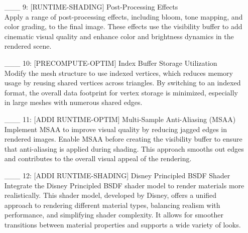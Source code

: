 \documentclass {article}
\begin{document}
\begin{enumerate}
     \item[\_\_\_ 9:]  [RUNTIME-SHADING] Post-Processing Effects
     \\ Apply a range of post-processing effects, including bloom, tone mapping, and color grading, to the final image. These 
     effects use the visibility buffer to add cinematic visual quality and enhance color and brightness dynamics in the rendered scene.
 
     \item[\_\_\_ 10:]  [PRECOMPUTE-OPTIM] Index Buffer Storage Utilization
     \\ Modify the mesh structure to use indexed vertices, which reduces memory usage by reusing shared vertices across triangles. 
     By switching to an indexed format, the overall data footprint for vertex storage is minimized, especially in large meshes with 
     numerous shared edges.
 
     \item[\_\_\_ 11:]  [ADDI RUNTIME-OPTIM] Multi-Sample Anti-Aliasing (MSAA)
     \\ Implement MSAA to improve visual quality by reducing jagged edges in rendered images. Enable MSAA before creating the 
     visibility buffer to ensure that anti-aliasing is applied during shading. This approach smooths out edges and contributes to 
     the overall visual appeal of the rendering.
 
     \item[\_\_\_ 12:]  [ADDI RUNTIME-SHADING] Disney Principled BSDF Shader
     \\ Integrate the Disney Principled BSDF shader model to render materials more realistically. This shader model, developed by 
     Disney, offers a unified approach to rendering different material types, balancing realism with performance, and simplifying 
     shader complexity. It allows for smoother transitions between material properties and supports a wide variety of looks.
 
\end{enumerate}
 
\printbibliography

\end{document}

